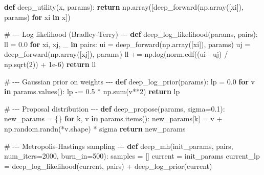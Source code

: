 \documentclass[
  letterpaper,
  numbers=noenddot,
  DIV=11]{scrreprt}
\newenvironment{Shaded}{\begin{snugshade}}{\end{snugshade}}
\newcommand{\BuiltInTok}[1]{\textcolor[rgb]{0.00,0.23,0.31}{#1}}
\newcommand{\CommentTok}[1]{\textcolor[rgb]{0.37,0.37,0.37}{#1}}
\newcommand{\ControlFlowTok}[1]{\textcolor[rgb]{0.00,0.23,0.31}{\textbf{#1}}}
\newcommand{\DecValTok}[1]{\textcolor[rgb]{0.68,0.00,0.00}{#1}}
\newcommand{\FloatTok}[1]{\textcolor[rgb]{0.68,0.00,0.00}{#1}}
\newcommand{\KeywordTok}[1]{\textcolor[rgb]{0.00,0.23,0.31}{\textbf{#1}}}
\newcommand{\NormalTok}[1]{\textcolor[rgb]{0.00,0.23,0.31}{#1}}
\newcommand{\OperatorTok}[1]{\textcolor[rgb]{0.37,0.37,0.37}{#1}}
\theoremstyle{plain}
\theoremstyle{definition}
\theoremstyle{remark}
\begin{document}
\begin{Shaded}
\begin{Highlighting}[numbers=left,,]
\KeywordTok{def}\NormalTok{ deep\_utility(x, params):}
    \ControlFlowTok{return}\NormalTok{ np.array([deep\_forward(np.array([xi]), params) }\ControlFlowTok{for}\NormalTok{ xi }\KeywordTok{in}\NormalTok{ x])}

\CommentTok{\# {-}{-}{-} Log likelihood (Bradley{-}Terry) {-}{-}{-}}
\KeywordTok{def}\NormalTok{ deep\_log\_likelihood(params, pairs):}
\NormalTok{    ll }\OperatorTok{=} \FloatTok{0.0}
    \ControlFlowTok{for}\NormalTok{ xi, xj, \_ }\KeywordTok{in}\NormalTok{ pairs:}
\NormalTok{        ui }\OperatorTok{=}\NormalTok{ deep\_forward(np.array([xi]), params)}
\NormalTok{        uj }\OperatorTok{=}\NormalTok{ deep\_forward(np.array([xj]), params)}
\NormalTok{        ll }\OperatorTok{+=}\NormalTok{ np.log(norm.cdf((ui }\OperatorTok{{-}}\NormalTok{ uj) }\OperatorTok{/}\NormalTok{ np.sqrt(}\DecValTok{2}\NormalTok{)) }\OperatorTok{+} \FloatTok{1e{-}6}\NormalTok{)}
    \ControlFlowTok{return}\NormalTok{ ll}

\CommentTok{\# {-}{-}{-} Gaussian prior on weights {-}{-}{-}}
\KeywordTok{def}\NormalTok{ deep\_log\_prior(params):}
\NormalTok{    lp }\OperatorTok{=} \FloatTok{0.0}
    \ControlFlowTok{for}\NormalTok{ v }\KeywordTok{in}\NormalTok{ params.values():}
\NormalTok{        lp }\OperatorTok{{-}=} \FloatTok{0.5} \OperatorTok{*}\NormalTok{ np.}\BuiltInTok{sum}\NormalTok{(v}\OperatorTok{**}\DecValTok{2}\NormalTok{)}
    \ControlFlowTok{return}\NormalTok{ lp}

\CommentTok{\# {-}{-}{-} Proposal distribution {-}{-}{-}}
\KeywordTok{def}\NormalTok{ deep\_propose(params, sigma}\OperatorTok{=}\FloatTok{0.1}\NormalTok{):}
\NormalTok{    new\_params }\OperatorTok{=}\NormalTok{ \{\}}
    \ControlFlowTok{for}\NormalTok{ k, v }\KeywordTok{in}\NormalTok{ params.items():}
\NormalTok{        new\_params[k] }\OperatorTok{=}\NormalTok{ v }\OperatorTok{+}\NormalTok{ np.random.randn(}\OperatorTok{*}\NormalTok{v.shape) }\OperatorTok{*}\NormalTok{ sigma}
    \ControlFlowTok{return}\NormalTok{ new\_params}

\CommentTok{\# {-}{-}{-} Metropolis{-}Hastings sampling {-}{-}{-}}
\KeywordTok{def}\NormalTok{ deep\_mh(init\_params, pairs, num\_iters}\OperatorTok{=}\DecValTok{2000}\NormalTok{, burn\_in}\OperatorTok{=}\DecValTok{500}\NormalTok{):}
\NormalTok{    samples }\OperatorTok{=}\NormalTok{ []}
\NormalTok{    current }\OperatorTok{=}\NormalTok{ init\_params}
\NormalTok{    current\_lp }\OperatorTok{=}\NormalTok{ deep\_log\_likelihood(current, pairs) }\OperatorTok{+}\NormalTok{ deep\_log\_prior(current)}


\end{Highlighting}
\end{Shaded}
\end{document}
